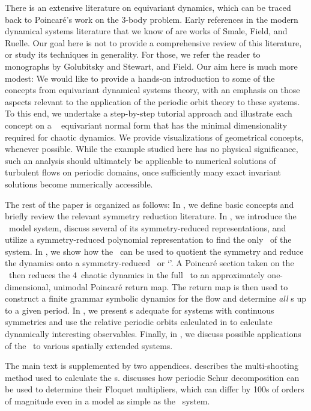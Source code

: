 \documentclass[aip,cha,
reprint,
secnumarabic,
nofootinbib, tightenlines,
nobibnotes, showkeys, showpacs,
superscriptaddress,
]{revtex4-1}
\begin{document}
There is an extensive literature on equivariant dynamics,
which can be traced back to Poincar\'e's work on the 3-body problem.
Early references in the modern dynamical systems
literature that we know of are works of Smale,
Field, and Ruelle. Our goal here is not to
provide a comprehensive review of this literature, or study its
techniques in generality. For those, we refer the reader to monographs
by Golubitsky and Stewart, and Field.
Our aim here is much more modest: We would like to
provide a hands-on introduction to some of the concepts from
equivariant dynamical systems theory, with an emphasis on those aspects
relevant to the application of the periodic orbit theory to these systems. To this end,
we undertake a step-by-step tutorial approach and illustrate each concept on a
\twomode\  equivariant normal form that has the minimal
dimensionality required for chaotic dynamics. We provide
visualizations of geometrical concepts, whenever possible.
While the example studied here has no physical significance,
such an analysis should ultimately be applicable to numerical solutions of
turbulent flows on periodic domains, once sufficiently many exact
invariant solutions become numerically accessible.

The rest of the paper is organized as follows: In , we
define basic concepts and briefly review the relevant symmetry reduction
literature. In , we introduce the \twomode\ model
system, discuss several of its symmetry-reduced representations,
and utilize a symmetry-reduced polynomial representation to find the only \reqv\ of the
system. In , we show how the \mslices\ can be used to
quotient the symmetry and reduce the dynamics onto a symmetry-reduced
\statesp\ or `\slice '. A Poincar\'e section taken on the \slice\ then
reduces the 4\dmn\ chaotic dynamics in the full \statesp\ to an approximately
one-dimensional, unimodal Poincar\'e return map. The return map is then
used to construct a finite grammar symbolic dynamics for the flow and
determine {\em all} \rpo s up to a given period. In ,
we present {\cycForm s} adequate for systems with continuous symmetries
and use the relative periodic orbits calculated in 
to calculate dynamically interesting observables. Finally, in ,
we discuss possible applications of the \mslices\ to various spatially
extended systems.

The main text is supplemented by two appendices.  describes
the multi-shooting method used to calculate the \rpo s.
 discusses how periodic Schur decomposition can be used
to determine their Floquet multipliers, which can differ by 100s
of orders of magnitude even in a model as simple as the \twomode\ system.
\end{document}
